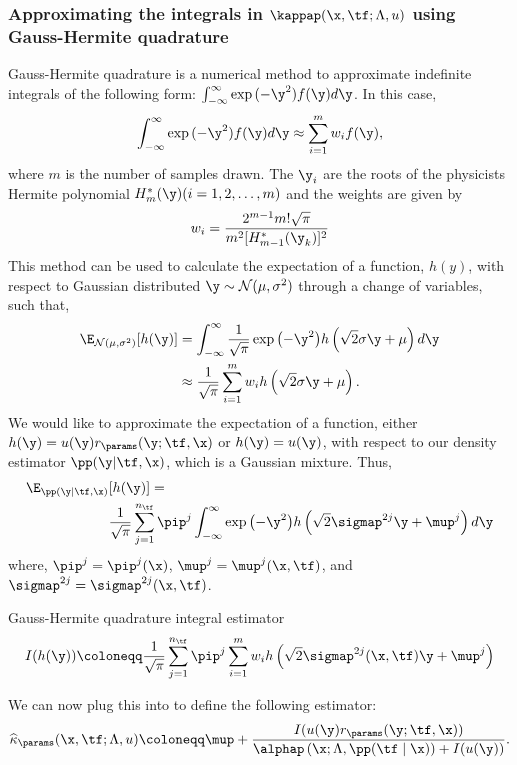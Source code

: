 \subsubsection{Approximating the integrals in $\kappap(\x, \tf; \Lambda, u)$ using Gauss-Hermite quadrature}
Gauss-Hermite quadrature is a numerical method to approximate indefinite integrals of the following form: $\int_{-\infty}^{\infty}\exp{(-\y^2)f(\y)d\y}$.
In this case,
\begin{equation*}
    \int_{-\infty}^{\infty}\exp{(-\y^2)f(\y)d\y} \approx \sum_{i=1}^{m}w_i f(\y),
\end{equation*}
where $m$ is the number of samples drawn. The $\y_i$ are the roots of the physicists Hermite polynomial $H^*_{m}(\y)(i=1, 2, \dots, m)$ and the weights are given by
\begin{equation*}
    w_i = \frac{2^{m-1}m!\sqrt{\pi}}{m^2[H^*_{m-1}(\y_k)]^2}
\end{equation*}
This method can be used to calculate the expectation of a function, $h(y)$, with respect to Gaussian distributed $\y \sim \mathcal{N}(\mu, \sigma^2)$ through a change of variables, such that,
\begin{equation*}
    \begin{split}
        \E_{\mathcal{N}(\mu, \sigma^2)}[h(\y)] &= \int_{-\infty}^{\infty} \frac{1}{\sqrt{\pi}}\exp{\left( -\y^2 \right)} h\left( \sqrt{2}\sigma \y + \mu \right) d\y   \\
        &\approx \frac{1}{\sqrt{\pi}} \sum_{i=1}^{m}w_i h\left( \sqrt{2}\sigma \y + \mu \right).
    \end{split}
\end{equation*}
We would like to approximate the expectation of a function, either $h(\y) = u(\y) r_{\params}(\y; \tf, \x)$ or $h(\y) = u(\y)$, with respect to our density estimator $\pp(\y | \tf, \x)$, which is a Gaussian mixture. Thus,
\begin{equation*}
    \begin{split}
        \E_{\pp(\y | \tf, \x)}&[h(\y)] = \\
        & \frac{1}{\sqrt{\pi}} \sum_{j=1}^{n_{\tf}} \pip^{j} \int_{-\infty}^{\infty} \exp{\left( -\y^2 \right)} h\left( \sqrt{2}\sigmap^{2j} \y + \mup^{j} \right) d\y
    \end{split}
\end{equation*}
where, $\pip^{j}=\pip^{j}(\x)$, $\mup^{j}=\mup^{j}(\x, \tf)$, and $\sigmap^{2j}=\sigmap^{2j}(\x, \tf)$.
\begin{definition}
\label{def:integral-estimator}
{\normalfont Gauss-Hermite quadrature integral estimator}
    \begin{equation*}
        I(h(\y)) \coloneqq \frac{1}{\sqrt{\pi}} \sum_{j=1}^{n_{\tf}} \pip^{j} \sum_{i=1}^{m} w_i h\left( \sqrt{2}\sigmap^{2j}(\x, \tf) \y + \mup^{j} \right)
    \end{equation*}
\end{definition}
We can now plug this into  to define the following estimator:
\begin{equation*}
    \widehat{\kappa}_{\params}(\x, \tf; \Lambda, u) \coloneqq \mup + \frac{I(u(\y) r_{\params}(\y; \tf, \x))}{\alphap\left(\x; \Lambda, \pp(\tf \mid \x)\right) + I(u(\y))}.
\end{equation*}

